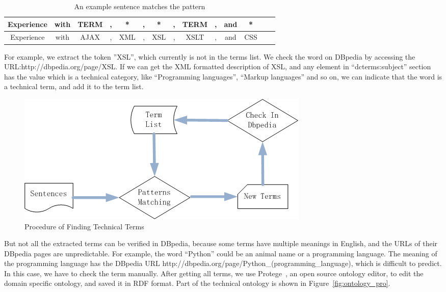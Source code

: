 \begin{table}[ht]
\caption{An example sentence matches the pattern} %
\centering %
\begin{tabular}{   | c | c | c | c |c | c |c | c |c | c |c | c |c | c |  }
 \hline
     Experience & with & TERM & , & *   & , & *   &, & TERM &, & and & *  \\
 \hline
     Experience & with & AJAX & , & XML & , & XSL &, & XSLT &, & and & CSS  \\
 \hline
\end{tabular}
\label{tab:termspattern} %
\end{table}

For example, we extract the token  ''XSL'', which currently is not in the terms list. We check the word on DBpedia by accessing the URL:http://dbpedia.org/page/XSL. If we can get the XML formatted description of XSL, and any element in ``dcterms:subject'' section has the value which is a technical category,  like ``Programming languages'', ``Markup languages'' and so on, we can indicate that the word is a technical term, and add it to the term list.

\begin{figure}[htbp]
  \includegraphics[scale=0.6]{images/genonto.png}
  \caption{Procedure of Finding Technical Terms}
  \label{fig:gen_onto}
\end{figure}

But not all the extracted terms can be verified in DBpedia, because some terms have multiple meanings in English, and the URLs of their DBpedia pages are unpredictable. For example, the word ``Python'' could be an animal name or a programming language.  The meaning of the programming language  has the DBpedia URL http://dbpedia.org/page/Python\_(programming\_language), which is difficult to predict. In this case, we have to check the term manually.  After getting all terms, we use Protege~\cite{noy2001creating}, an open source ontology editor, to edit the domain specific ontology, and saved it in RDF format. Part of the technical ontology is shown in Figure~\ref{fig:ontology_pro}.


